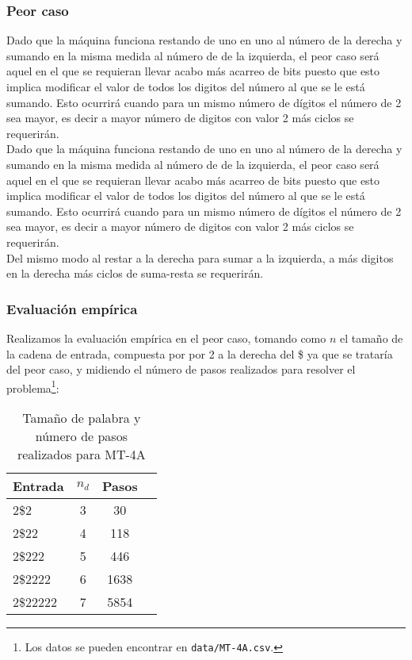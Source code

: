 \subsubsection*{Peor caso}
Dado que la máquina funciona restando de uno en uno al número de la derecha y sumando en la misma medida al número de de la izquierda, el peor caso será aquel en el que se requieran llevar acabo más acarreo de bits puesto que esto implica modificar el valor de todos los digitos del número al que se le está sumando. Esto ocurrirá cuando para un mismo número de dígitos el número de 2 sea mayor, es decir a mayor número de digitos con valor 2 más ciclos se requerirán.\\
Dado que la máquina funciona restando de uno en uno al número de la derecha y sumando en la misma medida al número de de la izquierda, el peor caso será aquel en el que se requieran llevar acabo más acarreo de bits puesto que esto implica modificar el valor de todos los digitos del número al que se le está sumando. Esto ocurrirá cuando para un mismo número de dígitos el número de 2 sea mayor, es decir a mayor número de digitos con valor 2 más ciclos se requerirán.\\
Del mismo modo al restar a la derecha para sumar a la izquierda, a más digitos en la derecha más ciclos de suma-resta se requerirán.


\subsubsection*{Evaluación empírica}
Realizamos la evaluación empírica en el peor caso, tomando como $n$ el tamaño de la cadena de entrada, compuesta por por 2 a la derecha del \$ ya que se trataría del peor caso, y midiendo el número de pasos realizados para resolver el problema\footnote{Los datos se pueden encontrar en \texttt{data/MT-4A.csv}.}:

\begin{table}[H]
    \centering
    \begin{tabular}{lccc}
        Entrada & $n_d$ & Pasos \\
        \hline
        2\$2                     & 3  & 30   \\
        2\$22                    & 4  & 118   \\
        2\$222                   & 5  & 446  \\
        2\$2222                  & 6  & 1638  \\
        2\$22222                 & 7  & 5854  \\
    \end{tabular}
    \caption{Tamaño de palabra y número de pasos realizados para MT-4A}
\end{table}


